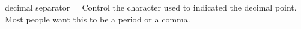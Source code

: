 \documentclass{ltxdoc}
\begin{document}
\begin{key}{decimal separator = }
Control the character used to indicated the decimal point. Most people want this to be a period or a comma.
\begin{tcblisting}{}
 \quad
{}
\end{tcblisting}
\end{key}
\end{document}
